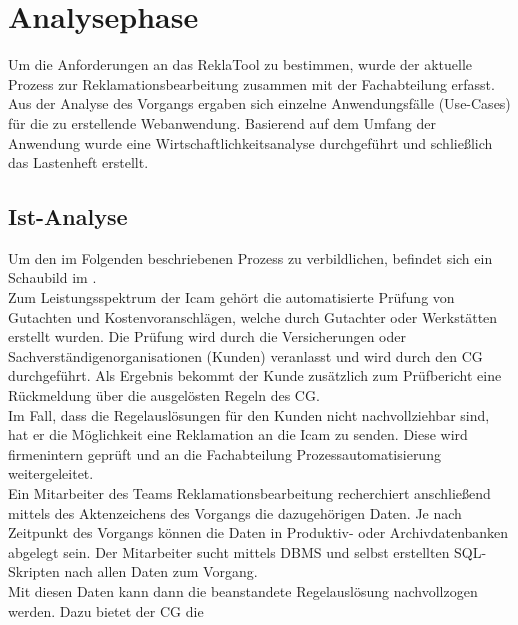 \section{Analysephase} 
\label{sec:Analysephase}
Um die Anforderungen an das ReklaTool zu bestimmen, wurde der aktuelle Prozess zur Reklamationsbearbeitung
zusammen mit der Fachabteilung erfasst. Aus der Analyse des Vorgangs ergaben sich
einzelne Anwendungsfälle (Use-Cases) für die zu erstellende Webanwendung.
Basierend auf dem Umfang der Anwendung wurde eine Wirtschaftlichkeitsanalyse durchgeführt und
schließlich das Lastenheft erstellt.

\subsection{Ist-Analyse} 
\label{sec:IstAnalyse}
Um den im Folgenden beschriebenen Prozess zu verbildlichen, befindet sich ein Schaubild im .\\
Zum Leistungsspektrum der \acs{Icam} gehört die automatisierte Prüfung von Gutachten und
Kostenvoranschlägen, welche durch Gutachter oder Werkstätten erstellt wurden.
Die Prüfung wird durch die Versicherungen oder Sachverständigenorganisationen (Kunden) veranlasst
und wird durch den \acs{CG} durchgeführt.
Als Ergebnis bekommt der Kunde zusätzlich zum Prüfbericht eine Rückmeldung über die ausgelösten Regeln des \acs{CG}.\\
Im Fall, dass die Regelauslösungen für den Kunden nicht nachvollziehbar sind, hat er die
Möglichkeit eine Reklamation an die \acs{Icam} zu senden. Diese wird firmenintern geprüft
und an die Fachabteilung Prozessautomatisierung weitergeleitet.\\
Ein Mitarbeiter des Teams Reklamationsbearbeitung recherchiert anschließend mittels des Aktenzeichens
des Vorgangs die dazugehörigen Daten. Je nach Zeitpunkt des Vorgangs können die Daten in Produktiv- oder Archivdatenbanken 
abgelegt sein. Der Mitarbeiter sucht mittels \ac{DBMS} und selbst 
erstellten SQL-Skripten nach allen Daten zum Vorgang.\\
Mit diesen Daten kann dann die beanstandete Regelauslösung nachvollzogen werden. Dazu bietet der \acs{CG} die 
